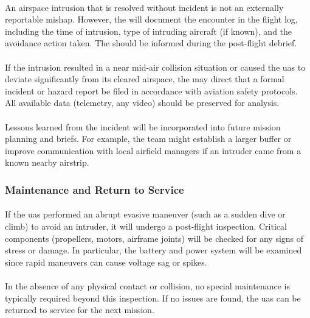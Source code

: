                 \paragraph{} An airspace intrusion that is resolved without incident is not an externally reportable mishap. However, the  will document the encounter in the flight log, including the time of intrusion, type of intruding aircraft (if known), and the avoidance action taken. The  should be informed during the post-flight debrief.
                
                \paragraph{} If the intrusion resulted in a near mid-air collision situation or caused the \ac{uas} to deviate significantly from its cleared airspace, the  may direct that a formal incident or hazard report be filed in accordance with aviation safety protocols. All available data (telemetry, any video) should be preserved for analysis.
                
                \paragraph{} Lessons learned from the incident will be incorporated into future mission planning and briefs. For example, the team might establish a larger buffer or improve communication with local airfield managers if an intruder came from a known nearby airstrip.
 
            \subsubsection{Maintenance and Return to Service}
            
                \paragraph{} If the \ac{uas} performed an abrupt evasive maneuver (such as a sudden dive or climb) to avoid an intruder, it will undergo a post-flight inspection. Critical components (propellers, motors, airframe joints) will be checked for any signs of stress or damage. In particular, the battery and power system will be examined since rapid maneuvers can cause voltage sag or spikes.
                
                \paragraph{} In the absence of any physical contact or collision, no special maintenance is typically required beyond this inspection. If no issues are found, the \ac{uas} can be returned to service for the next mission.
                
